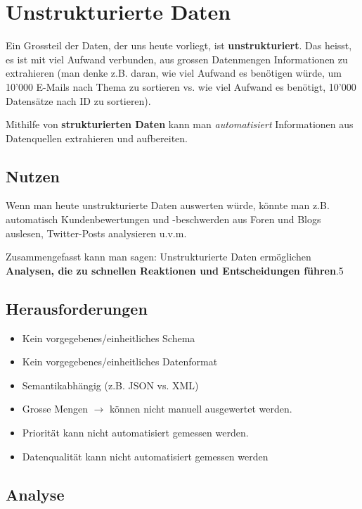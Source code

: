 \documentclass[a4paper, 11pt, nofootinbib]{article}
\begin{document}
\newpage

\section{Unstrukturierte Daten}
Ein Grossteil der Daten, der uns heute vorliegt, ist \textbf{unstrukturiert}. Das heisst, es ist mit viel Aufwand verbunden, aus grossen Datenmengen Informationen zu extrahieren (man denke z.B. daran, wie viel Aufwand es benötigen würde, um 10'000 E-Mails nach Thema zu sortieren vs. wie viel Aufwand es benötigt, 10'000 Datensätze nach ID zu sortieren).

Mithilfe von \textbf{strukturierten Daten} kann man \textit{automatisiert} Informationen aus Datenquellen extrahieren und aufbereiten.

\subsection{Nutzen}

\noindent Wenn man heute unstrukturierte Daten auswerten würde, könnte man z.B. automatisch Kundenbewertungen und -beschwerden aus Foren und Blogs auslesen, Twitter-Posts analysieren u.v.m. 

Zusammengefasst kann man sagen: Unstrukturierte Daten ermöglichen \textbf{Analysen, die zu schnellen Reaktionen und Entscheidungen führen}.5

\subsection{Herausforderungen}

\begin{itemize}
	\item Kein vorgegebenes/einheitliches Schema
	\item Kein vorgegebenes/einheitliches Datenformat
	\item Semantikabhängig (z.B. JSON vs. XML)
	\item Grosse Mengen $\rightarrow$ können nicht manuell ausgewertet werden.
	\item Priorität kann nicht automatisiert gemessen werden.
	\item Datenqualität kann nicht automatisiert gemessen werden
\end{itemize}

\subsection{Analyse}
\end{document}
